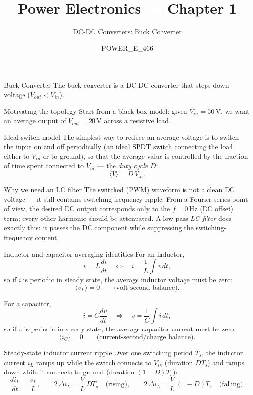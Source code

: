 \documentclass[11pt]{beamer}
\title{Power Electronics --- Chapter 1}
\subtitle{DC-DC Converters: Buck Converter}
\author{POWER\_E\_466}
\date{}
\begin{document}
\frame{\titlepage}

\begin{frame}{Buck Converter}
The buck converter is a DC-DC converter that steps down voltage
($V_{out} < V_{in}$).
\end{frame}

\begin{frame}{Motivating the topology}
Start from a black-box model: given $V_{in} = 50\,\text{V}$, we want an
average output of $V_{out} = 20\,\text{V}$ across a resistive load.
\end{frame}

\begin{frame}{Ideal switch model}
The simplest way to reduce an average voltage is to switch the input on
and off periodically (an ideal SPDT switch connecting the load either to
$V_{in}$ or to ground), so that the average value is controlled by the
fraction of time spent connected to $V_{in}$ --- the \emph{duty cycle}
$D$:
\[
  \langle V \rangle = D \, V_{in}.
\]
\end{frame}

\begin{frame}{Why we need an LC filter}
The switched (PWM) waveform is not a clean DC voltage --- it still
contains switching-frequency ripple. From a Fourier-series point of
view, the desired DC output corresponds only to the $f = 0\,\text{Hz}$
(DC offset) term; every other harmonic should be attenuated. A low-pass
\emph{LC filter} does exactly this: it passes the DC component while
suppressing the switching-frequency content.
\end{frame}

\begin{frame}{Inductor and capacitor averaging identities}
For an inductor,
\[
  v = L \frac{di}{dt}
  \quad\Longleftrightarrow\quad
  i = \frac{1}{L}\int v \, dt,
\]
so if $i$ is periodic in steady state, the average inductor voltage must
be zero:
\[
  \langle v_L \rangle = 0 \qquad \text{(volt-second balance)}.
\]

For a capacitor,
\[
  i = C \frac{dv}{dt}
  \quad\Longleftrightarrow\quad
  v = \frac{1}{C}\int i \, dt,
\]
so if $v$ is periodic in steady state, the average capacitor current
must be zero:
\[
  \langle i_C \rangle = 0 \qquad \text{(current-second/charge balance)}.
\]
\end{frame}

\begin{frame}{Steady-state inductor current ripple}
Over one switching period $T_s$, the inductor current $i_L$ ramps up
while the switch connects to $V_{in}$ (duration $DT_s$) and ramps down
while it connects to ground (duration $(1-D)T_s$):
\[
  \frac{di_L}{dt} = \frac{v_L}{L}, \qquad
  2\,\Delta i_L = \frac{V}{L}\,D T_s
  \quad\text{(rising)}, \qquad
  2\,\Delta i_L = \frac{V}{L}\,(1-D) T_s
  \quad\text{(falling)}.
\]
\end{frame}
\end{document}
